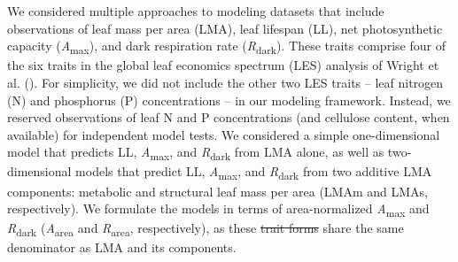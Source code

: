 \documentclass[
  12pt,
  letterpaper,
  DIV=11,
  numbers=noendperiod]{scrartcl}
\providecommand{\DIFadd}[1]{{\protect\color{blue}\uwave{#1}}} %
\providecommand{\DIFdel}[1]{{\protect\color{red}\sout{#1}}}                      %
\providecommand{\DIFaddbegin}{} %
\providecommand{\DIFaddend}{} %
\providecommand{\DIFdelbegin}{} %
\providecommand{\DIFdelend}{} %
\newcommand{\DIFscaledelfig}{0.5}
\newlength{\DIFdelgraphicswidth} %
\newlength{\DIFdelgraphicsheight} %
\newcommand{\DIFaddincludegraphics}[2][]{{\color{blue}\fbox{\DIFOincludegraphics[#1]{#2}}}} %
\newcommand{\DIFdelincludegraphics}[2][]{%
\sbox{\DIFdelgraphicsbox}{\DIFOincludegraphics[#1]{#2}}%
\settoboxwidth{\DIFdelgraphicswidth}{\DIFdelgraphicsbox} %
\settoboxtotalheight{\DIFdelgraphicsheight}{\DIFdelgraphicsbox} %
\scalebox{\DIFscaledelfig}{%
\parbox[b]{\DIFdelgraphicswidth}{\usebox{\DIFdelgraphicsbox}\\[-\baselineskip] \rule{\DIFdelgraphicswidth}{0em}}\llap{\resizebox{\DIFdelgraphicswidth}{\DIFdelgraphicsheight}{%
\setlength{\unitlength}{\DIFdelgraphicswidth}%
\begin{picture}(1,1)%
\thicklines\linethickness{2pt} %
{\color[rgb]{1,0,0}\put(0,0){\framebox(1,1){}}}%
{\color[rgb]{1,0,0}\put(0,0){\line( 1,1){1}}}%
{\color[rgb]{1,0,0}\put(0,1){\line(1,-1){1}}}%
\end{picture}%
}\hspace*{3pt}}} %
} %
\DeclareRobustCommand{\DIFaddbegin}{\DIFOaddbegin \let\includegraphics\DIFaddincludegraphics} %
\DeclareRobustCommand{\DIFaddend}{\DIFOaddend \let\includegraphics\DIFOincludegraphics} %
\DeclareRobustCommand{\DIFdelbegin}{\DIFOdelbegin \let\includegraphics\DIFdelincludegraphics} %
\DeclareRobustCommand{\DIFdelend}{\DIFOaddend \let\includegraphics\DIFOincludegraphics} %
\begin{document}
We considered multiple approaches to modeling datasets that include
observations of leaf mass per area (LMA), leaf lifespan (LL), net
photosynthetic capacity (\emph{A}\textsubscript{max}), and dark
respiration rate (\emph{R}\textsubscript{dark}). These traits comprise
four of the six traits in the global leaf economics spectrum (LES)
analysis of Wright \DIFaddbegin \DIFadd{IJ }\DIFaddend et al. (). For
simplicity, we did not include the other two LES traits -- leaf nitrogen
(N) and phosphorus (P) concentrations -- in our modeling framework.
Instead, we reserved observations of leaf N and P concentrations (and
cellulose content, when available) for independent model tests. We
considered a simple one-dimensional model that predicts LL,
\emph{A}\textsubscript{max}, and \emph{R}\textsubscript{dark} from LMA
alone, as well as two-dimensional models that predict LL,
\emph{A}\textsubscript{max}, and \emph{R}\textsubscript{dark} from two
additive LMA components: metabolic and structural leaf mass per area
(LMAm and LMAs, respectively). We formulate the models in terms of
area-normalized \emph{A}\textsubscript{max} and
\emph{R}\textsubscript{dark} (\emph{A}\textsubscript{area} and
\emph{R}\textsubscript{area}, respectively), as these \DIFdelbegin \DIFdel{trait forms }\DIFdelend \DIFaddbegin \DIFadd{area-normalized
traits }\DIFaddend share the same denominator as LMA and its components.
\end{document}

